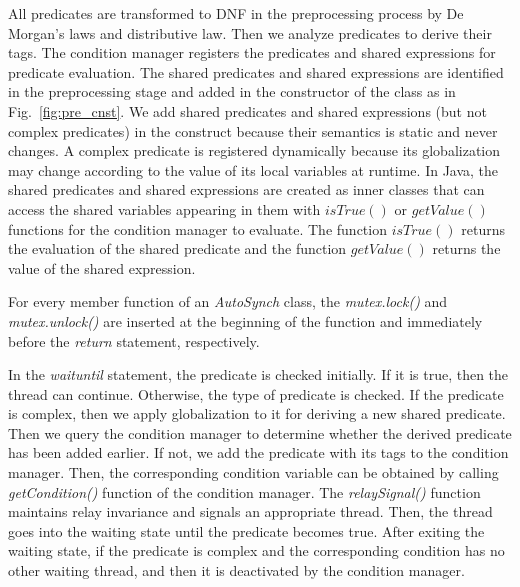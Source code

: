 \documentclass{sigplanconf}
\begin{document}
All predicates are transformed to DNF in the preprocessing process by De Morgan's laws and 
distributive law. Then we analyze predicates to derive their tags. The condition 
manager registers the predicates and shared expressions for predicate 
evaluation. 
The shared 
predicates and shared expressions are identified in the preprocessing stage and added 
in the constructor of the class as in Fig.~\ref{fig:pre_cnst}. We add shared
predicates and shared expressions (but not complex predicates) in the construct because their semantics is
static and never changes. A complex predicate is registered dynamically
because its globalization may change according to the value of its local variables at
runtime. In Java, the shared 
predicates and shared expressions are created as inner classes that can access
the shared variables appearing in them with
$isTrue()$ or $getValue()$ functions for the condition manager to evaluate.
The function $isTrue()$ returns the evaluation of the shared predicate and
the function $getValue()$ returns the value of the shared expression.


For every member function of an {\em AutoSynch} class, the {\em mutex.lock()} and
{\em mutex.unlock()} are inserted at the beginning of the function and immediately before
the {\em return} statement, respectively.
%  


In the {\em waituntil} statement, the predicate is checked initially. If 
it is true, then the thread can continue. Otherwise, the type of
predicate is checked. If the predicate is complex, then we apply globalization 
to it for deriving a new shared predicate. Then we query the condition manager 
to determine
whether the derived predicate has been added earlier. If not, we add the 
predicate with its tags to the condition manager. Then, the corresponding 
condition variable can be obtained by calling {\em getCondition()} function of the
condition manager. The {\em relaySignal()} function maintains relay invariance 
and signals an appropriate thread. Then, the thread goes into the waiting state 
until the predicate becomes true. After exiting the waiting state, if the 
predicate is complex and the corresponding condition has no other 
waiting thread, and then it is deactivated by the condition manager.
\end{document}
